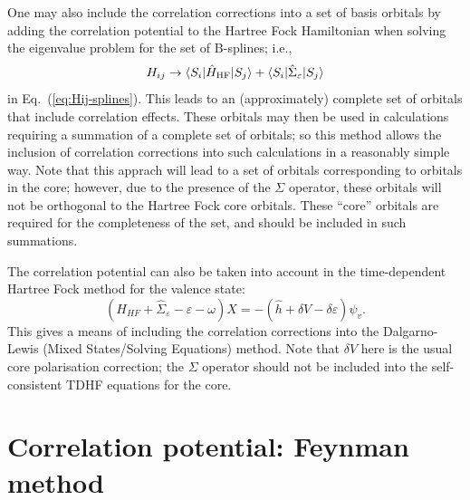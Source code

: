 \documentclass[10pt,twocolumn,a4paper]{article}%
\newcommand{\bra}[1]{\ensuremath{\langle #1|}}	%
\newcommand{\ket}[1]{\ensuremath{|#1\rangle}}	%
\newcommand{\be}{\begin{equation}}
\newcommand{\ee}{\end{equation}}
\def\en{\ensuremath{\varepsilon}}
\newcommand{\w}{\ensuremath{\omega}}
\begin{document}
One may also include the correlation corrections into a set of basis orbitals by adding the correlation potential to the Hartree Fock Hamiltonian when solving the eigenvalue problem for the set of B-splines; i.e.,
\be
H_{ij} \to \bra{S_i}\hat H_{\rm HF}\ket{S_j}  + \bra{S_i}\hat \Sigma_\en\ket{S_j}
\ee
in Eq.~(\ref{eq:Hij-splines}).
This leads to an (approximately) complete set of orbitals that include correlation effects.
These orbitals may then be used in calculations requiring a summation of a complete set of orbitals; so this method allows the inclusion of correlation corrections into such calculations in a reasonably simple way.
Note that this apprach will lead to a set of orbitals corresponding to orbitals in the core; however, due to the presence of the $\Sigma$ operator, these orbitals will not be orthogonal to the Hartree Fock core orbitals.
These ``core'' orbitals are required for the completeness of the set, and should be included in such summations. %

The correlation potential can also be taken into account in the time-dependent Hartree Fock method for the valence state:
\be
\left( H_{HF} +\hat\Sigma_\en -  \en -\w \right)X = -\left(\hat h + \delta V - \delta \en \right)\psi_v.
\ee
This gives a means of including the correlation corrections into the Dalgarno-Lewis (Mixed States/Solving Equations) method.
Note that $\delta V$ here is the usual core polarisation correction; the $\Sigma$ operator should not be included into the self-consistent TDHF equations for the core.












\section{Correlation potential: Feynman method}
\end{document}
